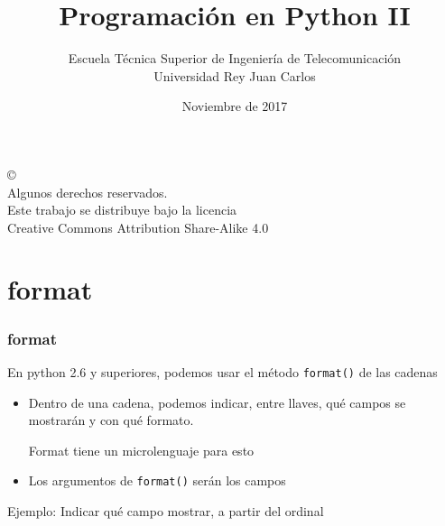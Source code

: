 \documentclass[ucs]{beamer}
\begin{document}
\title[Programación en Python II]{Programación en Python II}
\author[GSyC]{Escuela Técnica Superior de Ingeniería de Telecomunicación\\
Universidad Rey Juan Carlos}
\date[2017]{Noviembre de 2017}


\begin{frame}
  \titlepage
\end{frame}



\begin{frame}[b]
\begin{flushright}
{\tiny
\copyright \insertshortdate~\insertshortauthor \\
  Algunos derechos reservados. \\
  Este trabajo se distribuye bajo la licencia \\
  Creative Commons Attribution Share-Alike 4.0\\
}
\end{flushright}  
\end{frame}





\section{format}

\begin{frame}[fragile]
\frametitle{format}
En python 2.6 y superiores, podemos usar el método
\verb|format()| de las cadenas


\begin{itemize}
\item
Dentro de una cadena, podemos indicar, entre llaves,
qué campos se mostrarán y con qué formato.

Format tiene un microlenguaje para esto
\item
Los argumentos de 
\verb|format()| serán los campos
\end{itemize}

Ejemplo:
Indicar qué campo mostrar, a partir del ordinal 

\end{frame}
\end{document}
